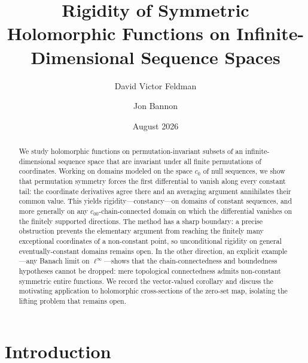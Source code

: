 \documentclass[11pt]{amsart}
\newcommand{\cc}{c_{00}}
\newcommand{\czero}{c_{0}}
\theoremstyle{plain}
\theoremstyle{definition}
\theoremstyle{remark}
\begin{document}
\title[Rigidity of Symmetric Holomorphic Functions]{Rigidity of Symmetric
Holomorphic Functions on Infinite-Dimensional Sequence Spaces}

\author{David Victor Feldman}
\address{Department of Mathematics and Statistics, University of New
Hampshire, Durham, NH 03824, USA}

\author{Jon Bannon}
\address{Department of Mathematics, Siena College, Loudonville, NY 12211, USA}

\date{August 2026}


\begin{abstract}
We study holomorphic functions on permutation-invariant subsets of an
infinite-dimensional sequence space that are invariant under all finite
permutations of coordinates. Working on domains modeled on the space
$\czero$ of null sequences, we show that permutation symmetry forces the
first differential to vanish along every constant tail: the coordinate
derivatives agree there and an averaging argument annihilates their common
value. This yields rigidity---constancy---on domains of constant sequences,
and more generally on any $\cc$-chain-connected domain on which the
differential vanishes on the finitely supported directions. The method has
a sharp boundary: a precise obstruction prevents the elementary argument
from reaching the finitely many exceptional coordinates of a non-constant
point, so unconditional rigidity on general eventually-constant domains
remains open. In the other direction, an explicit example---any Banach
limit on $\ell^\infty$---shows that the chain-connectedness and boundedness
hypotheses cannot be dropped: mere topological connectedness admits
non-constant symmetric entire functions.
We record the vector-valued corollary and discuss the motivating
application to holomorphic cross-sections of the zero-set map, isolating the
lifting problem that remains open.
\end{abstract}

\maketitle

\section{Introduction}
\label{sec:intro}
\end{document}
